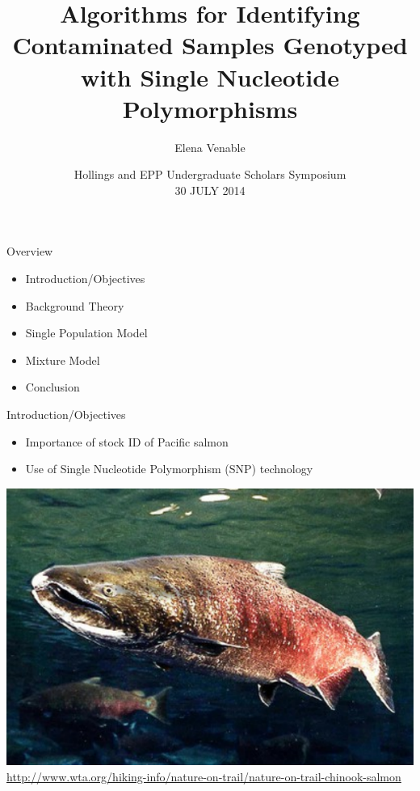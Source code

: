 \documentclass[letter,graphicx]{beamer}
\title[SNP contamination identification with Bayesian methods\hspace{2em}\insertframenumber] %
{Algorithms for Identifying Contaminated Samples Genotyped with Single Nucleotide Polymorphisms}
\subtitle{} %
\author[Elena Venable] %
{Elena Venable}
\institute[Brown Univeristy] %
{
Brown University \\ Applied Mathematics - Biology \\ Healthy Oceans \\ Southwest Fisheries Science Center, Santa Cruz, CA \\ Eric C. Anderson
}
\date[CSGM--2014] %
{
 Hollings and EPP Undergraduate Scholars Symposium \\ 30 JULY 2014}
\def\Tiny{\fontsize{3pt}{3pt} \selectfont}
\begin{document}
\begin{frame}
  \titlepage
\end{frame}

\begin{frame}{Overview}
   \begin{itemize}
	\item Introduction/Objectives
	\item Background Theory
	\item Single Population Model
	\item Mixture Model
	\item Conclusion
   \end{itemize}
\end{frame}

\begin{frame}{Introduction/Objectives}
   \begin{itemize}
	\item Importance of stock ID of Pacific salmon
		\vspace{2mm}
	\item Use of Single Nucleotide Polymorphism (SNP) technology
   \end{itemize}
   \vspace{2mm}
  \centering  \includegraphics[width=.75\textwidth]{images/salmon_individual}
  \Tiny
  \url{http://www.wta.org/hiking-info/nature-on-trail/nature-on-trail-chinook-salmon}
   
\end{frame}
\end{document}
